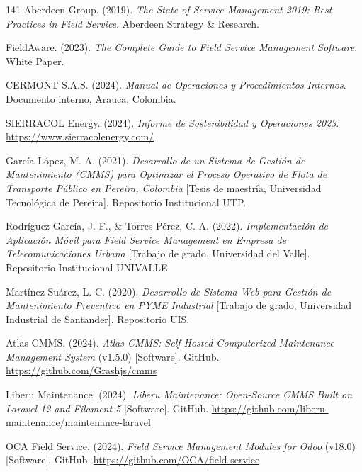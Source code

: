 \begin{thebibliography}{141}
Aberdeen Group. (2019). \textit{The State of Service Management 2019: Best Practices in Field Service}. Aberdeen Strategy \& Research.

FieldAware. (2023). \textit{The Complete Guide to Field Service Management Software}. White Paper.


CERMONT S.A.S. (2024). \textit{Manual de Operaciones y Procedimientos Internos}. Documento interno, Arauca, Colombia.

SIERRACOL Energy. (2024). \textit{Informe de Sostenibilidad y Operaciones 2023}. \url{https://www.sierracolenergy.com/}


García López, M. A. (2021). \textit{Desarrollo de un Sistema de Gestión de Mantenimiento (CMMS) para Optimizar el Proceso Operativo de Flota de Transporte Público en Pereira, Colombia} [Tesis de maestría, Universidad Tecnológica de Pereira]. Repositorio Institucional UTP.

Rodríguez García, J. F., \& Torres Pérez, C. A. (2022). \textit{Implementación de Aplicación Móvil para Field Service Management en Empresa de Telecomunicaciones Urbana} [Trabajo de grado, Universidad del Valle]. Repositorio Institucional UNIVALLE.


Martínez Suárez, L. C. (2020). \textit{Desarrollo de Sistema Web para Gestión de Mantenimiento Preventivo en PYME Industrial} [Trabajo de grado, Universidad Industrial de Santander]. Repositorio UIS.


Atlas CMMS. (2024). \textit{Atlas CMMS: Self-Hosted Computerized Maintenance Management System} (v1.5.0) [Software]. GitHub. \url{https://github.com/Grashjs/cmms}

Liberu Maintenance. (2024). \textit{Liberu Maintenance: Open-Source CMMS Built on Laravel 12 and Filament 5} [Software]. GitHub. \url{https://github.com/liberu-maintenance/maintenance-laravel}

OCA Field Service. (2024). \textit{Field Service Management Modules for Odoo} (v18.0) [Software]. GitHub. \url{https://github.com/OCA/field-service}


\end{thebibliography}
